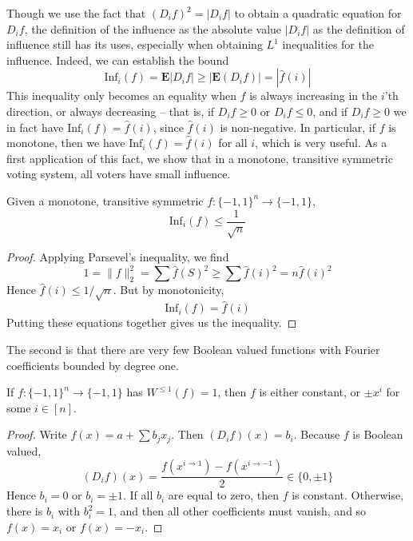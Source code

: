Though we use the fact that $(D_if)^2 = |D_if|$ to obtain a quadratic equation for $D_i f$, the definition of the influence as the absolute value $|D_if|$ as the definition of influence still has its uses, especially when obtaining $L^1$ inequalities for the influence. Indeed, we can establish the bound
%
\[ \text{Inf}_i(f) = \mathbf{E}|D_if| \geq \left| \mathbf{E}(D_i f) \right| = | \widehat{f}(i) | \]
%
This inequality only becomes an equality when $f$ is always increasing in the $i$'th direction, or always decreasing -- that is, if $D_i f \geq 0$ or $D_i f \leq 0$, and if $D_i f \geq 0$ we in fact have $\text{Inf}_i(f) = \widehat{f}(i)$, since $\widehat{f}(i)$ is non-negative. In particular, if $f$ is monotone, then we have $\text{Inf}_i(f) = \widehat{f}(i)$ for all $i$, which is very useful. As a first application of this fact, we show that in a monotone, transitive symmetric voting system, all voters have small influence.

\begin{theorem}
    Given a monotone, transitive symmetric $f: \{ -1, 1 \}^n \to \{ -1, 1 \}$,
    \[ \text{Inf}_i(f) \leq \frac{1}{\sqrt{n}} \]
\end{theorem}
\begin{proof}
    Applying Parsevel's inequality, we find
    \[ 1 = \| f \|_2^2 = \sum \widehat{f}(S)^2 \geq \sum \widehat{f}(i)^2 = n \widehat{f}(i)^2 \]
    Hence $\widehat{f}(i) \leq 1/\sqrt{n}$. But by monotonicity,
    \[ \text{Inf}_i(f) = \widehat{f}(i) \]
    Putting these equations together gives us the inequality.
\end{proof}

The second is that there are very few Boolean valued functions with Fourier coefficients bounded by degree one.

\begin{lemma}
    If $f: \{ -1, 1 \}^n \to \{ -1, 1 \}$ has $W^{\leq 1}(f) = 1$, then $f$ is either constant, or $\pm x^i$ for some $i \in [n]$.
\end{lemma}
\begin{proof}
    Write $f(x) = a + \sum b_j x_j$. Then $(D_i f)(x) = b_i$. Because $f$ is Boolean valued,
    \[ (D_i f)(x) = \frac{f(x^{i \to 1}) - f(x^{i \to -1})}{2} \in \{ 0, \pm 1 \} \]
    Hence $b_i = 0$ or $b_i = \pm 1$. If all $b_i$ are equal to zero, then $f$ is constant. Otherwise, there is $b_i$ with $b_i^2 = 1$, and then all other coefficients must vanish, and so $f(x) = x_i$ or $f(x) = -x_i$.
\end{proof}

